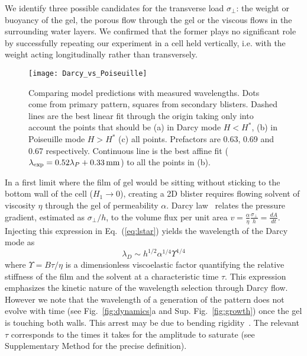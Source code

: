 \documentclass[twocolumn,superscriptaddress,showpacs,preprintnumbers,
amsmath,amssymb,prl]{revtex4-1}
\begin{document}
We identify three possible candidates for the transverse load $\sigma_\perp$: the weight or buoyancy of the gel, the porous flow through the gel or the viscous flows in the surrounding water layers. We confirmed that the former plays no significant role by successfully repeating our experiment in a cell held vertically, i.e. with the weight acting longitudinally rather than transversely.

\begin{figure*}
	\texttt{[image: Darcy\_vs\_Poiseuille]}
	\caption{Comparing model predictions with measured wavelengths. Dots come from primary pattern, squares from secondary blisters. Dashed lines are the best linear fit through the origin taking only into account the points that should be (a) in Darcy mode $H<H^*$, (b) in Poiseuille mode $H>H^*$ (c) all points. Prefactors are 0.63, 0.69 and 0.67 respectively. Continuous line is the best affine fit ($\lambda_{\rm exp}=0.52\lambda_{P}+\SI{0.33}{\milli\metre}$) to all the points in (b).}
	\label{fig:DarcyPoiseuille}
\end{figure*}

In a first limit where the film of gel would be sitting without sticking to the bottom wall of the cell ($H_1\rightarrow0$), creating a 2D blister requires flowing solvent of viscosity $\eta$ through the gel of permeability $\alpha$. Darcy law~\cite{Darcy1856} relates the pressure gradient, estimated as $\sigma_\perp/h$, to the volume flux per unit area $v = \frac{\alpha}{\eta}\frac{\sigma_\perp}{h} = \frac{dA}{dt}$. Injecting this expression in Eq.~(\ref{eq:lstar}) yields the wavelength of the Darcy mode as
\begin{equation}
\lambda_D \sim h^{1/2} \alpha^{1/4} \Upsilon^{1/4}
\end{equation}
where $\Upsilon = B\tau/\eta$ is a dimensionless viscoelastic factor quantifying the relative stiffness of the film and the solvent at a characteristic time $\tau$. This expression emphasizes the kinetic nature of the wavelength selection through Darcy flow. However we note that the wavelength of a generation of the pattern does not evolve with time (see Fig.~\ref{fig:dynamics}a and Sup. Fig.~\ref{fig:growth}) once the gel is touching both walls. This arrest may be due to bending rigidity~\cite{LeGoff2014}. The relevant $\tau$ corresponds to the times it takes for the amplitude to saturate (see Supplementary Method for the precise definition).
\end{document}
